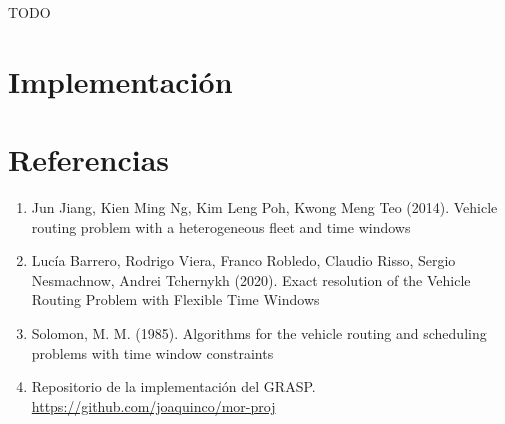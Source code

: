 \documentclass{article}
\begin{document}
  TODO

  \section*{Implementación}

  \section*{Referencias}

  \begin{enumerate}
    \item{\label{jiang} Jun Jiang, Kien Ming Ng, Kim Leng Poh, Kwong Meng Teo (2014). Vehicle routing problem with a heterogeneous fleet and time windows}
    \item{\label{inco} Lucía Barrero, Rodrigo Viera, Franco Robledo, Claudio Risso, Sergio Nesmachnow, Andrei Tchernykh (2020). Exact resolution of the Vehicle Routing Problem with Flexible Time Windows}
    \item{\label{solomon} Solomon, M. M. (1985). Algorithms for the vehicle routing and scheduling problems with time window constraints}
    \item{\label{repo} Repositorio de la implementación del GRASP. \url{https://github.com/joaquinco/mor-proj}}
  \end{enumerate}
\end{document}
